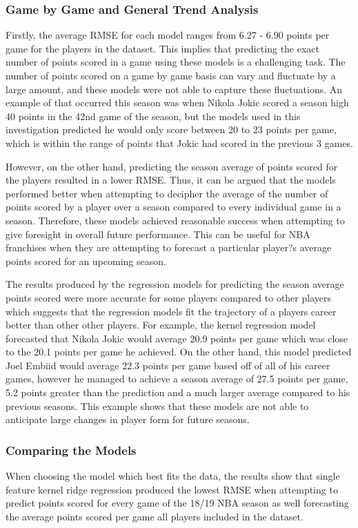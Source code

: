 \documentclass[a4paper,11pt,twoside]{article}
\begin{document}
\subsubsection{Game by Game and General Trend Analysis}
Firstly, the average RMSE for each model ranges from 6.27 - 6.90 points per game for the players in the dataset. This implies that predicting the exact number of points scored in a game using these models is a challenging task. The number of points scored on a game by game basis can vary and fluctuate by a large amount, and these models were not able to capture these fluctuations. An example of that occurred this season was when Nikola Jokic scored a season high 40 points in the 42nd game of the season, but the models used in this investigation predicted he would only score between 20 to 23 points per game, which is within the range of points that Jokic had scored in the previous 3 games. 

However, on the other hand, predicting the season average of points scored for the players resulted in a lower RMSE. Thus, it can be argued that the models performed better when attempting to decipher the average of the number of points scored by a player over a season compared to every individual game in a season. Therefore, these models achieved reasonable success when attempting to give foresight in overall future performance. This can be useful for NBA franchises when they are attempting to forecast a particular player?s average points scored for an upcoming season.

The results produced by the regression models for predicting the season average points scored were more accurate for some players compared to other players which suggests that the regression models fit the trajectory of a players career better than other other players. For example, the kernel regression model forecasted that Nikola Jokic would average 20.9 points per game which was close to the 20.1 points per game he achieved. On the other hand, this model predicted Joel Embiid would average 22.3 points per game based off of all of his career games, however he managed to achieve a season average of 27.5 points per game, 5.2 points greater than the prediction and a much larger average compared to his previous seasons. This example shows that these models are not able to anticipate large changes in player form for future seasons.


\subsubsection{Comparing the Models}
When choosing the model which best fits the data, the results show that single feature kernel ridge regression produced the lowest RMSE when attempting to predict points scored for every game of the 18/19 NBA season as well forecasting the average points scored per game all players included in the dataset.
\end{document}

